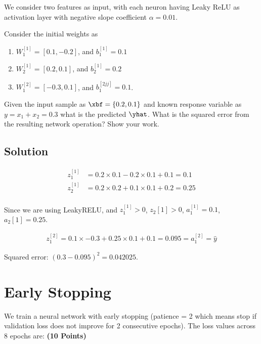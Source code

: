 \documentclass[12pt, xcolor=dvipsnames,svgnames,x11names]{article}
\begin{document}
We consider two features as input, with each neuron having Leaky ReLU as activation layer with negative slope coefficient $\alpha = 0.01$.

Consider the initial weights as

\begin{enumerate}
\item $W_1^{[1]} = [0.1, -0.2]$, and $b_1^{[1]} = 0.1$
\item $W_2^{[1]} = [0.2, 0.1]$, and $b_2^{[1]} = 0.2$
\item $W_1^{[2]} = [-0.3, 0.1]$, and $b_1^{[2jj]} = 0.1$.

\end{enumerate}

Given the input sample as $ \xbf = \{0.2, 0.1\}$ and known response variable as $y = x_1 + x_2 = 0.3$ what is the predicted $\yhat$. What is the squared error from the resulting network operation? Show your work.


\subsection{Solution}

\begin{align*}
z_1^{[1]} & = 0.2 \times 0.1 - 0.2\times 0.1 + 0.1 = 0.1\\
z_2^{[1]} & = 0.2 \times 0.2 + 0.1 \times 0.1 + 0.2 = 0.25\\
\end{align*}

Since we are using LeakyRELU, and $z_1^{[1]} > 0$, $z_2 {[1]} > 0$, $a_1^{[1]} = 0.1$, $a_2 {[1]} = 0.25$.

\begin{align*}
z_1^{[2]} = 0.1 \times -0.3 + 0.25 \times 0.1 + 0.1 = 0.095 = a_1^{[2]} = \hat{y}
\end{align*}

Squared error: $(0.3 - 0.095)^2 = 0.042025$.




\section{Early Stopping} We train a neural network with early stopping (patience = 2 which means stop if validation loss does not improve for 2 consecutive epochs). The loss values across 8 epochs are: \hfill \textbf{(10 Points)}
\end{document}
